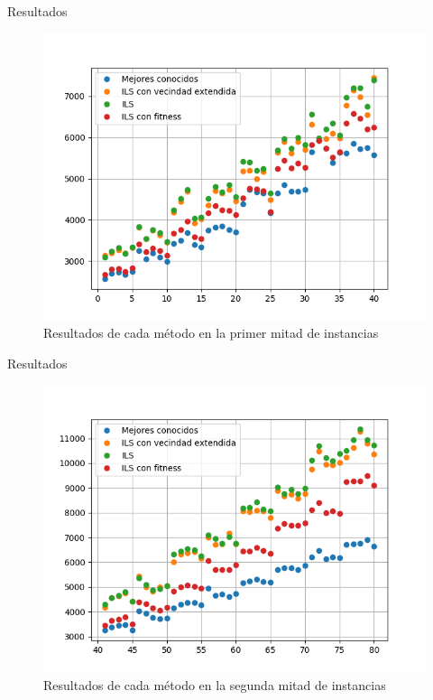 \documentclass[11pt]{beamer}
\begin{document}
\begin{frame}{Resultados}
\begin{figure}
\includegraphics[scale=.6]{bestres/best1.png}
\caption{Resultados de cada método en la primer mitad de instancias}
\end{figure}
\end{frame}

\begin{frame}{Resultados}
\begin{figure}
\includegraphics[scale=.6]{bestres/best2.png}
\caption{Resultados de cada método en la segunda mitad de instancias}
\end{figure}
\end{frame}
\end{document}
